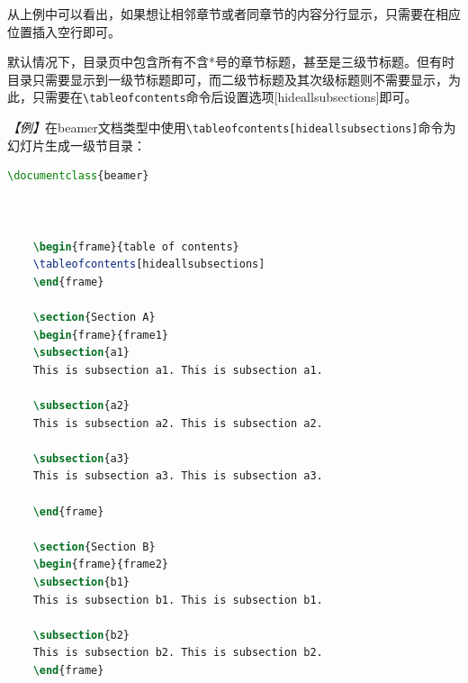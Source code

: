 从上例中可以看出，如果想让相邻章节或者同章节的内容分行显示，只需要在相应位置插入空行即可。

默认情况下，目录页中包含所有不含*号的章节标题，甚至是三级节标题。但有时目录只需要显示到一级节标题即可，而二级节标题及其次级标题则不需要显示，为此，只需要在\texttt{\textbackslash{}tableofcontents}命令后设置选项[hideallsubsections]即可。

\emph{【例】}在beamer文档类型中使用\texttt{\textbackslash{}tableofcontents[hideallsubsections]}命令为幻灯片生成一级节目录：
\begin{lstlisting}[language=TeX]
    \documentclass{beamer}

    

    \begin{frame}{table of contents}
    \tableofcontents[hideallsubsections]
    \end{frame}

    \section{Section A}
    \begin{frame}{frame1}
    \subsection{a1}
    This is subsection a1. This is subsection a1.

    \subsection{a2}
    This is subsection a2. This is subsection a2.

    \subsection{a3}
    This is subsection a3. This is subsection a3.

    \end{frame}

    \section{Section B}
    \begin{frame}{frame2}
    \subsection{b1}
    This is subsection b1. This is subsection b1.

    \subsection{b2}
    This is subsection b2. This is subsection b2.
    \end{frame}

    
\end{lstlisting}

